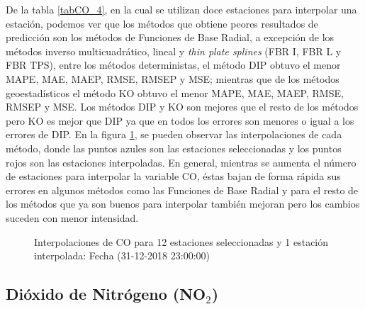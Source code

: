 De la tabla \ref{tabCO_4}, en la cual se utilizan doce estaciones para interpolar una estación, podemos ver que los métodos que obtiene peores resultados de predicción son los métodos de Funciones de Base Radial, a excepción de los métodos inverso multicuadrático, lineal y {\em thin plate splines} (FBR I,  FBR L y FBR TPS), entre los métodos deterministas, el método DIP obtuvo el menor MAPE, MAE, MAEP, RMSE, RMSEP y MSE; mientras que de los métodos geoestadísticos el método KO obtuvo el menor MAPE, MAE, MAEP, RMSE, RMSEP y MSE. Los métodos DIP y KO son mejores que el resto de los métodos pero KO es mejor que DIP ya que en todos los errores son menores o igual a los errores de DIP. En la figura \ref{COfigure4}, se pueden observar las interpolaciones de cada método, donde las puntos azules son las estaciones seleccionadas y los puntos rojos son las estaciones interpoladas. En general, mientras se aumenta el número de estaciones para interpolar la variable CO, éstas bajan de forma rápida sus errores en algunos métodos como las Funciones de Base Radial y para el resto de los métodos que ya son buenos para interpolar también mejoran pero los cambios suceden con menor intensidad.


\begin{figure}[H]
\centering
{}
\subfigure[KO] {\texttt{[image: ./ok\_12\_0\_26302]}}
\subfigure[KU] {\texttt{[image: ./uk\_12\_0\_26302]}}
\caption{Interpolaciones de CO para 12 estaciones seleccionadas y 1 estación interpolada: Fecha (31-12-2018 23:00:00)}
\label{COfigure4}
\end{figure}






\subsection{Dióxido de Nitrógeno (NO$_{2}$)}

